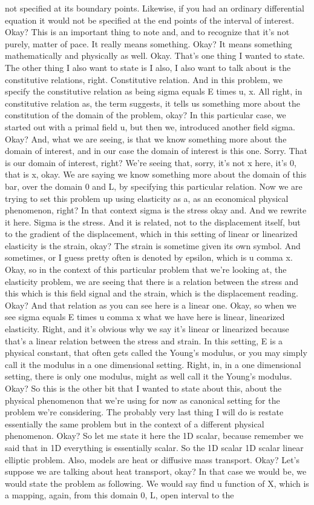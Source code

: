 \documentclass[10pt]{article}
\begin{document}
not specified at its boundary points. Likewise, if you had an ordinary differential equation it would not be specified at the end points of the interval of interest. Okay? This is an important thing to note and, and to recognize that it's not purely, matter of pace. It really means something. Okay? It means something mathematically and physically as well. Okay. That's one thing I wanted to state. The other thing I also want to state is I also, I also want to talk about is the constitutive relations, right. Constitutive relation. And in this problem, we specify the constitutive relation as being sigma equals E times u, x. All right, in constitutive relation as, the term suggests, it tells us something more about the constitution of the domain of the problem, okay? In this particular case, we started out with a primal field u, but then we, introduced another field sigma. Okay? And, what we are seeing, is that we know something more about the domain of interest, and in our case the domain of interest is this one. Sorry. That is our domain of interest, right? We're seeing that, sorry, it's not x here, it's 0, that is x, okay. We are saying we know something more about the domain of this bar, over the domain 0 and L, by specifying this particular relation. Now we are trying to set this problem up using elasticity as a, as an economical physical phenomenon, right? In that context sigma is the stress okay and. And we rewrite it here. Sigma is the stress. And it is related, not to the displacement itself, but to the gradient of the displacement, which in this setting of linear or linearized elasticity is the strain, okay? The strain is sometime given its own symbol. And sometimes, or I guess pretty often is denoted by epsilon, which is u comma x. Okay, so in the context of this particular problem that we're looking at, the elasticity problem, we are seeing that there is a relation between the stress and this which is this field signal and the strain, which is the displacement reading. Okay? And that relation as you can see here is a linear one. Okay, so when we see sigma equals E times u comma x what we have here is linear, linearized elasticity. Right, and it's obvious why we say it's linear or linearized because that's a linear relation between the stress and strain. In this setting, E is a physical constant, that often gets called the Young's modulus, or you may simply call it the modulus in a one dimensional setting. Right, in, in a one dimensional setting, there is only one modulus, might as well call it the Young's modulus. Okay? So this is the other bit that I wanted to state about this, about the physical phenomenon that we're using for now as canonical setting for the problem we're considering. The probably very last thing I will do is restate essentially the same problem but in the context of a different physical phenomenon. Okay? So let me state it here the 1D scalar, because remember we said that in 1D everything is essentially scalar. So the 1D scalar 1D scalar linear elliptic problem. Also, models are heat or diffusive mass transport. Okay? Let's suppose we are talking about heat transport, okay? In that case we would be, we would state the problem as following. We would say find u function of X, which is a mapping, again, from this domain 0, L, open interval to the 
\end{document}
